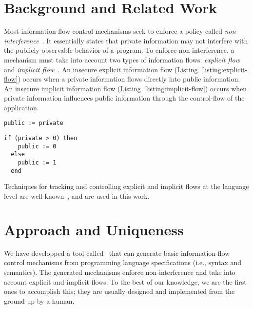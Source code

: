 \documentclass[sigplan,10pt]{acmart}\settopmatter{printfolios=true,printccs=false,printacmref=false}
\begin{document}
\section{Background and Related Work}
Most information-flow control mechanisms seek to enforce a policy called \emph{non-interference}~\cite{DBLP:conf/sp/GoguenM82a}. It essentially states that private information may not interfere with the publicly observable behavior of a program. To enforce non-interference, a mechanism must take into account two types of information flows: \emph{explicit flow} and \emph{implicit flow}~\cite{DBLP:journals/cacm/Denning76}. An insecure explicit information flow (Listing~\ref{listing:explicit-flow}) occurs when a private information flows directly into public information. An insecure implicit information flow (Listing~\ref{listing:implicit-flow}) occurs when private information influences public information through the control-flow of the application.

\begin{lstlisting}[captionpos=b, caption=Insecure explicit flow, label=listing:explicit-flow]
  public := private
\end{lstlisting}

\begin{lstlisting}[captionpos=b, caption=Insecure implicit flow, label=listing:implicit-flow]
  if (private > 0) then
    public := 0
  else
    public := 1
  end
\end{lstlisting}

Techniques for tracking and controlling explicit and implicit flows at the language level are well known~\cite{DBLP:journals/jcs/VolpanoIS96, DBLP:conf/csfw/RussoS10}, and are used in this work. 



\section{Approach and Uniqueness}
We have developped a tool called \ottifc\ that can generate basic information-flow control mechanisms from programming language specifications (i.e., syntax and semantics). The generated mechanisms enforce non-interference and take into account explicit and implicit flows. To the best of our knowledge, we are the first ones to accomplish this; they are usually designed and implemented from the ground-up by a human.
\end{document}
